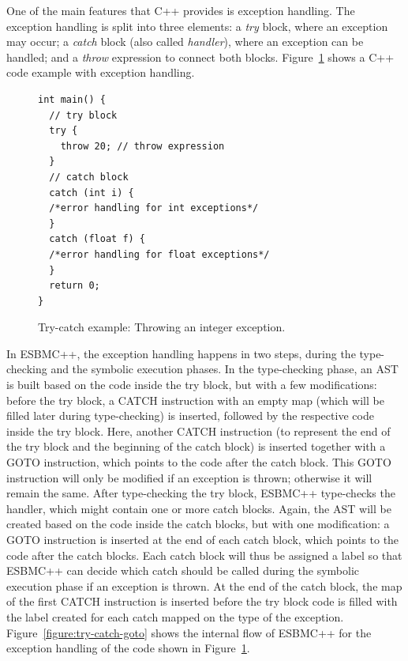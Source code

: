 \documentclass[conference]{IEEEtran}
\begin{document}
One of the main features that C++ provides is exception handling.
The exception handling
is split into three elements: a \emph{try} block, where an exception may
occur; a \emph{catch} block (also called \emph{handler}), where an exception
can be handled; and a \emph{throw}
expression to connect both blocks. Figure~\ref{figure:try-catch-example}
shows a C++ code example with exception handling.
%
\begin{figure}[ht]
\centering
\begin{minipage}{0.45\textwidth}
\begin{lstlisting}
int main() {
  // try block
  try {
    throw 20; // throw expression
  }
  // catch block
  catch (int i) {
  /*error handling for int exceptions*/
  }
  catch (float f) {
  /*error handling for float exceptions*/
  }
  return 0;
}
\end{lstlisting}
\end{minipage}
\caption{Try-catch example: Throwing an integer exception.}
\label{figure:try-catch-example}
\end{figure}

In ESBMC++, the exception handling happens in two steps,
during the type-checking and the symbolic execution phases.
In the type-checking phase, an AST is built based on the code
inside the try block, but with a few modifications: before the try block,
a CATCH instruction with an empty map (which will be filled later during
type-checking) is inserted, followed by the respective code inside
the try block. Here, another CATCH instruction (to represent the end of the
try block and the beginning of the catch block) is inserted together with
a GOTO instruction, which points to the code after the catch block.
This GOTO instruction will only be modified if an exception is thrown;
otherwise it will remain the same. After type-checking the try block,
ESBMC++ type-checks the handler, which might contain one or more catch blocks.
Again, the AST will be created based on the code inside the catch blocks, but
with one modification: a GOTO instruction is inserted at the end of
each catch block, which points to the code after the catch blocks. Each catch block
will thus be assigned a label so that ESBMC++ can decide which catch should be called
during the symbolic execution phase if an exception is thrown. At the end
of the catch block, the map of the first CATCH instruction is
inserted before the try block code is filled with the label created
for each catch mapped on the type of the exception. Figure~\ref{figure:try-catch-goto}
shows the internal flow of ESBMC++ for the exception handling of the code shown in
Figure~\ref{figure:try-catch-example}.
\end{document}
